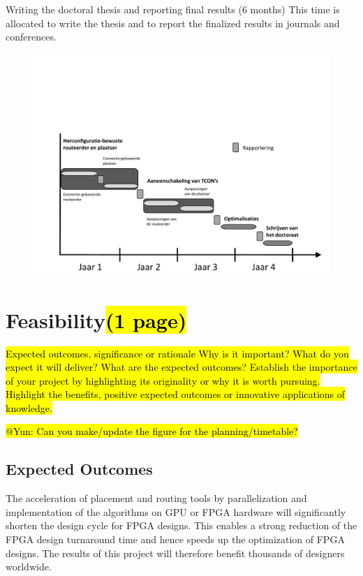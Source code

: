 \documentclass[a4paper,oneside,12pt]{article}
\begin{document}
\begin{description*}
\item[Writing the doctoral thesis and reporting final results (6 months)] This time is allocated to write the thesis and to report the finalized results in journals and conferences.  

\end{description*}

\begin{figure}[ht]
\centering
\includegraphics[width = \textwidth,trim = 0mm 0mm 0mm 70mm, clip]{tijdschema.pdf}
\end{figure}

\newpage
\section{Feasibility\hl{(1 page)}}
\hl{Expected outcomes, significance or rationale
Why is it important? 
What do you expect it will deliver? 
What are the expected outcomes? 
Establish the importance of your project by highlighting its originality or why it is worth pursuing. Highlight the benefits, positive expected outcomes or innovative applications of knowledge.}

\hl{@Yun: Can you make/update the figure for the planning/timetable?}

\subsection{Expected Outcomes}
The acceleration of placement and routing tools by parallelization and implementation of the algorithms on GPU or FPGA hardware will significantly shorten the design cycle for FPGA designs. This enables a strong reduction of the FPGA design turnaround time and hence speeds up the optimization of FPGA designs. The results of this project will therefore benefit thousands of designers worldwide.
\end{document}
